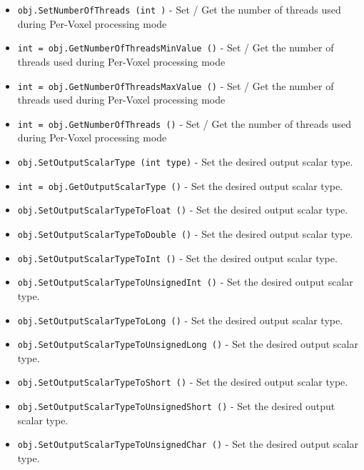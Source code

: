 \begin{itemize}
\item  \verb|obj.SetNumberOfThreads (int )| -  Set / Get the number of threads used during Per-Voxel processing mode

\item  \verb|int = obj.GetNumberOfThreadsMinValue ()| -  Set / Get the number of threads used during Per-Voxel processing mode

\item  \verb|int = obj.GetNumberOfThreadsMaxValue ()| -  Set / Get the number of threads used during Per-Voxel processing mode

\item  \verb|int = obj.GetNumberOfThreads ()| -  Set / Get the number of threads used during Per-Voxel processing mode

\item  \verb|obj.SetOutputScalarType (int type)| -  Set the desired output scalar type.

\item  \verb|int = obj.GetOutputScalarType ()| -  Set the desired output scalar type.

\item  \verb|obj.SetOutputScalarTypeToFloat ()| -  Set the desired output scalar type.

\item  \verb|obj.SetOutputScalarTypeToDouble ()| -  Set the desired output scalar type.

\item  \verb|obj.SetOutputScalarTypeToInt ()| -  Set the desired output scalar type.

\item  \verb|obj.SetOutputScalarTypeToUnsignedInt ()| -  Set the desired output scalar type.

\item  \verb|obj.SetOutputScalarTypeToLong ()| -  Set the desired output scalar type.

\item  \verb|obj.SetOutputScalarTypeToUnsignedLong ()| -  Set the desired output scalar type.

\item  \verb|obj.SetOutputScalarTypeToShort ()| -  Set the desired output scalar type.

\item  \verb|obj.SetOutputScalarTypeToUnsignedShort ()| -  Set the desired output scalar type.

\item  \verb|obj.SetOutputScalarTypeToUnsignedChar ()| -  Set the desired output scalar type.


\end{itemize}
